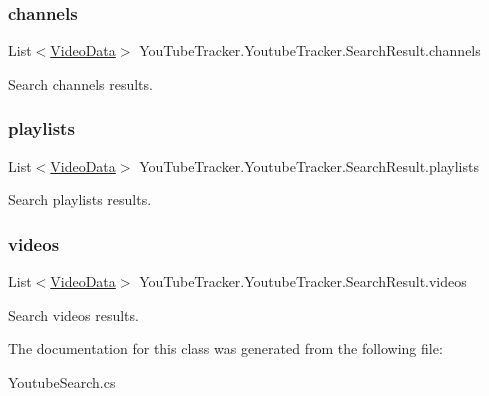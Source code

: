 \subsubsection{\texorpdfstring{channels}{channels}}
{\footnotesize\ttfamily List$<$\mbox{\hyperlink{struct_you_tube_tracker_1_1_video_data}{Video\+Data}}$>$ You\+Tube\+Tracker.\+Youtube\+Tracker.\+Search\+Result.\+channels}



Search channels results. 

\mbox{\label{class_you_tube_tracker_1_1_youtube_tracker_1_1_search_result_a4d9162b386c247731a23d8c44934fdbf}} 
\subsubsection{\texorpdfstring{playlists}{playlists}}
{\footnotesize\ttfamily List$<$\mbox{\hyperlink{struct_you_tube_tracker_1_1_video_data}{Video\+Data}}$>$ You\+Tube\+Tracker.\+Youtube\+Tracker.\+Search\+Result.\+playlists}



Search playlists results. 

\mbox{\label{class_you_tube_tracker_1_1_youtube_tracker_1_1_search_result_a59c445d69a5f87735ddb589d7e3be7f8}} 
\subsubsection{\texorpdfstring{videos}{videos}}
{\footnotesize\ttfamily List$<$\mbox{\hyperlink{struct_you_tube_tracker_1_1_video_data}{Video\+Data}}$>$ You\+Tube\+Tracker.\+Youtube\+Tracker.\+Search\+Result.\+videos}



Search videos results. 



The documentation for this class was generated from the following file\+:\begin{DoxyCompactItemize}
\item 
Youtube\+Search.\+cs\end{DoxyCompactItemize}
